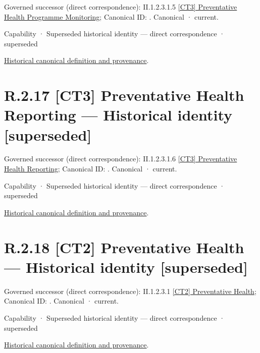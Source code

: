 {\small Governed successor (direct correspondence): II.1.2.3.1.5 \hyperref[element:945b40ced8004e1cbf7c98c731d17daf]{[CT3] Preventative Health Programme Monitoring}; Canonical ID: \texttt{}. Canonical · current.}\par
\label{element:e05f6310f6d544efaca5568604f27dd8}
{\small Capability · Superseded historical identity — direct correspondence · superseded}\par
\href{../../../../continuum/strategy/capability/e05f6310f6d544efaca5568604f27dd8.md}{Historical canonical definition and provenance}.\par
\section*{R.2.17 [CT3] Preventative Health Reporting — Historical identity [superseded]}
\label{navigation:R.2.17}

{\small Governed successor (direct correspondence): II.1.2.3.1.6 \hyperref[element:d2ef01c4cab348df822e802ab084faae]{[CT3] Preventative Health Reporting}; Canonical ID: \texttt{}. Canonical · current.}\par
\label{element:4faef45b4ebe4fa69e57c3d81bfea05f}
{\small Capability · Superseded historical identity — direct correspondence · superseded}\par
\href{../../../../continuum/strategy/capability/4faef45b4ebe4fa69e57c3d81bfea05f.md}{Historical canonical definition and provenance}.\par
\section*{R.2.18 [CT2] Preventative Health — Historical identity [superseded]}
\label{navigation:R.2.18}

{\small Governed successor (direct correspondence): II.1.2.3.1 \hyperref[element:81be04a2d58548a4aea94f9aae90feb6]{[CT2] Preventative Health}; Canonical ID: \texttt{}. Canonical · current.}\par
\label{element:80affa7bcd284ecbbcbc5092f8497ddf}
{\small Capability · Superseded historical identity — direct correspondence · superseded}\par
\href{../../../../continuum/strategy/capability/80affa7bcd284ecbbcbc5092f8497ddf.md}{Historical canonical definition and provenance}.\par
